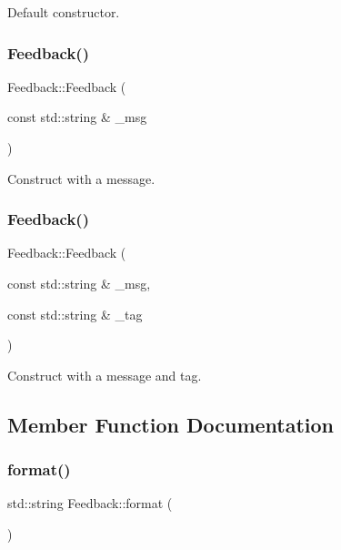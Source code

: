 Default constructor. \hypertarget{class_feedback_ad479227db3f800f497f287a4f550daa1}{}\label{class_feedback_ad479227db3f800f497f287a4f550daa1} 
\subsubsection{\texorpdfstring{Feedback()}{Feedback()}\hspace{0.1cm}{\footnotesize\ttfamily [2/3]}}
{\footnotesize\ttfamily Feedback\+::\+Feedback (\begin{DoxyParamCaption}\item[{const std\+::string \&}]{\+\_\+msg }\end{DoxyParamCaption})\hspace{0.3cm}{\ttfamily [inline]}}

Construct with a message. \hypertarget{class_feedback_a6e2ac37abb3f6679b36a8ad037985c36}{}\label{class_feedback_a6e2ac37abb3f6679b36a8ad037985c36} 
\subsubsection{\texorpdfstring{Feedback()}{Feedback()}\hspace{0.1cm}{\footnotesize\ttfamily [3/3]}}
{\footnotesize\ttfamily Feedback\+::\+Feedback (\begin{DoxyParamCaption}\item[{const std\+::string \&}]{\+\_\+msg,  }\item[{const std\+::string \&}]{\+\_\+tag }\end{DoxyParamCaption})\hspace{0.3cm}{\ttfamily [inline]}}

Construct with a message and tag. 

\subsection{Member Function Documentation}
\hypertarget{class_feedback_a0b03ebf0611fe0d7e0595c50a64739e7}{}\label{class_feedback_a0b03ebf0611fe0d7e0595c50a64739e7} 
\subsubsection{\texorpdfstring{format()}{format()}}
{\footnotesize\ttfamily std\+::string Feedback\+::format (\begin{DoxyParamCaption}{ }\end{DoxyParamCaption})}

